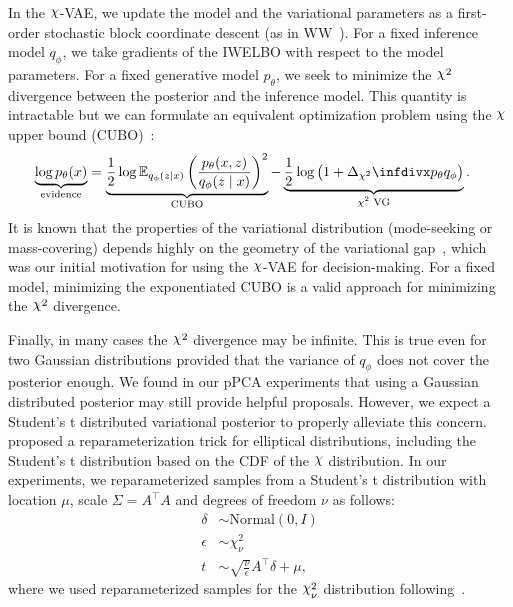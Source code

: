 In the $\rchi$-VAE, we update the model and the variational parameters as a first-order stochastic block coordinate descent (as in WW~\cite{le2018revisiting}). For a fixed inference model $q_\phi$, we take gradients of the IWELBO with respect to the model parameters. For a fixed generative model $p_\theta$, we seek to minimize the $\rchi^2$ divergence between the posterior and the inference model. This quantity is intractable but we can formulate an equivalent optimization problem using the $\rchi$ upper bound (CUBO)~\cite{NIPS2017_6866}:
\begin{align}
\begin{split}
    \underbrace{\log p_\theta(x)}_{\text{evidence}} &= \underbrace{\frac{1}{2}\log\mathbb{E}_{q_\phi(z \mid x)}\left(\frac{p_\theta(x, z)}{q_\phi(z \mid x)}\right)^2}_{\text{CUBO}} - \underbrace{\frac{1}{2}\log\left(1 + \chidiv{p_\theta}{q_\phi}\right)}_{\text{$\chi^2$ VG}}. \label{CUBO}
\end{split}
\end{align}
It is known that the properties of the variational distribution (mode-seeking or mass-covering) depends highly on the geometry of the variational gap~\cite{futami2018variational}, which was our initial motivation for using the $\rchi$-VAE for decision-making. For a fixed model, minimizing the exponentiated CUBO is a valid approach for minimizing the $\rchi^2$ divergence. 

Finally, in many cases the $\rchi^2$ divergence may be infinite. This is true even for two Gaussian distributions provided that the variance of $q_\phi$ does not cover the posterior enough. We found in our pPCA experiments that using a Gaussian distributed posterior may still provide helpful proposals. However, we expect a Student's t distributed variational posterior to properly alleviate this concern. \cite{NIPS2018_7699} proposed a reparameterization trick for elliptical distributions, including the Student's t distribution based on the CDF of the $\rchi$ distribution. In our experiments, we reparameterized samples from a Student's t distribution with location $\mu$, scale $\Sigma = A^\top A$ and degrees of freedom $\nu$ as follows:
\begin{align}
    \delta &\sim \textrm{Normal}(0, I) \\
    \epsilon &\sim \chi^2_\nu\\
    t &\sim \sqrt{\frac{\nu}{\epsilon}}A^\top \delta + \mu,
\end{align} 
where we used reparameterized samples for the $\rchi^2_\nu$ distribution following~\cite{figurnov2018implicit}.



